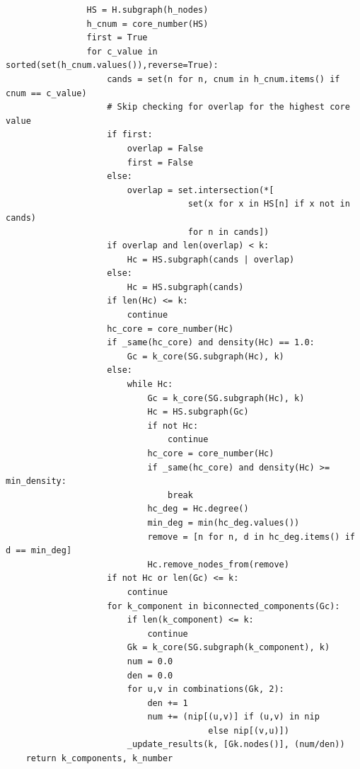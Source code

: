 \begin{footnotesize}
\begin{lstlisting}
                HS = H.subgraph(h_nodes)
                h_cnum = core_number(HS)
                first = True
                for c_value in sorted(set(h_cnum.values()),reverse=True):
                    cands = set(n for n, cnum in h_cnum.items() if cnum == c_value)
                    # Skip checking for overlap for the highest core value
                    if first:
                        overlap = False
                        first = False
                    else:
                        overlap = set.intersection(*[
                                    set(x for x in HS[n] if x not in cands)
                                    for n in cands])
                    if overlap and len(overlap) < k:
                        Hc = HS.subgraph(cands | overlap)
                    else:
                        Hc = HS.subgraph(cands)
                    if len(Hc) <= k:
                        continue
                    hc_core = core_number(Hc)
                    if _same(hc_core) and density(Hc) == 1.0:
                        Gc = k_core(SG.subgraph(Hc), k)
                    else:
                        while Hc:
                            Gc = k_core(SG.subgraph(Hc), k)
                            Hc = HS.subgraph(Gc)
                            if not Hc:
                                continue
                            hc_core = core_number(Hc)
                            if _same(hc_core) and density(Hc) >= min_density:
                                break
                            hc_deg = Hc.degree()
                            min_deg = min(hc_deg.values())
                            remove = [n for n, d in hc_deg.items() if d == min_deg]
                            Hc.remove_nodes_from(remove)
                    if not Hc or len(Gc) <= k:
                        continue
                    for k_component in biconnected_components(Gc):
                        if len(k_component) <= k:
                            continue
                        Gk = k_core(SG.subgraph(k_component), k)
                        num = 0.0
                        den = 0.0
                        for u,v in combinations(Gk, 2):
                            den += 1
                            num += (nip[(u,v)] if (u,v) in nip
                                        else nip[(v,u)])
                        _update_results(k, [Gk.nodes()], (num/den))
    return k_components, k_number
\end{lstlisting}
\end{footnotesize}

\newpage

